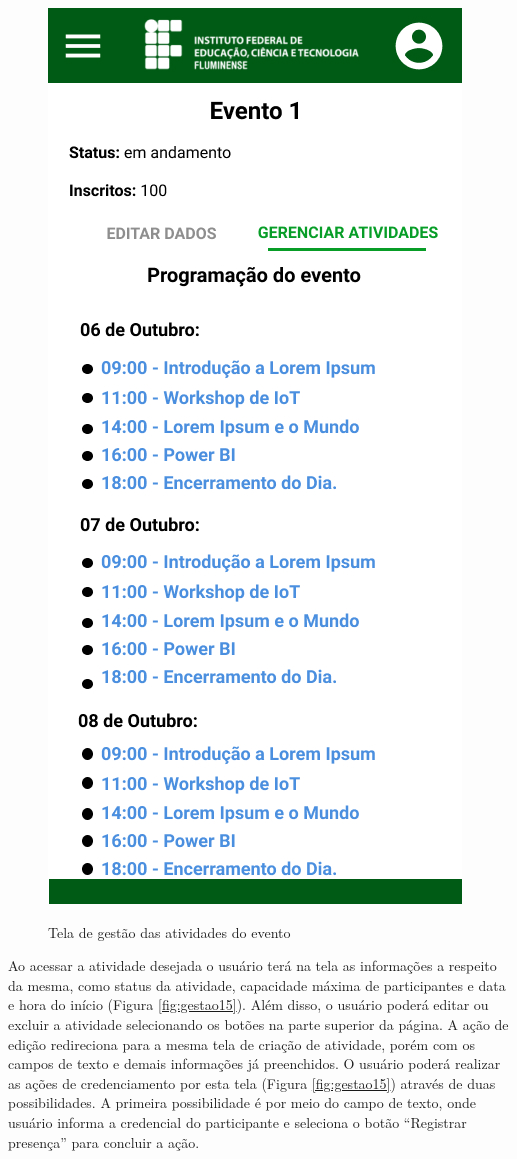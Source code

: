 \begin{figure}[H]
    \centering
    \caption{Tela de gestão das atividades do evento}
    \includegraphics[scale=0.44]{figuras/Gestao/14-GerenciarAtividades.jpg}
    \label{fig:gestao14}
\end{figure}

Ao acessar a atividade desejada o usuário terá na tela as informações a respeito da mesma, como status da atividade, capacidade máxima de participantes e data e hora do início (Figura \ref{fig:gestao15}). Além disso, o usuário poderá editar ou excluir a atividade selecionando os botões na parte superior da página. A ação de edição redireciona para a mesma tela de criação de atividade, porém com os campos de texto e demais informações já preenchidos. O usuário poderá realizar as ações de credenciamento por esta tela (Figura \ref{fig:gestao15}) através de duas possibilidades. A primeira possibilidade é por meio do campo de texto, onde usuário informa a credencial do participante e seleciona o botão “Registrar presença” para concluir a ação.

